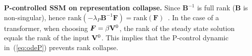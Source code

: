 \textbf{P-controlled SSM on representation collapse.} Since $\bm{B}^{-1}$ is full rank ($\bm{B}$ is non-singular), hence $\mathrm{rank}(-\lambda_P\bm{B}^{-1}\bm{F}) = \mathrm{rank}(\bm{F})$~\cite{strang2006linear}. In the case of a transformer, when choosing $\bm{F} = \beta {\mathbf V}^0$, the rank of the steady state solution equals the rank of the input ${\mathbf V}^0$. This implies that the P-control dynamic in~(\ref{eq:odeP}) prevents rank collapse.
